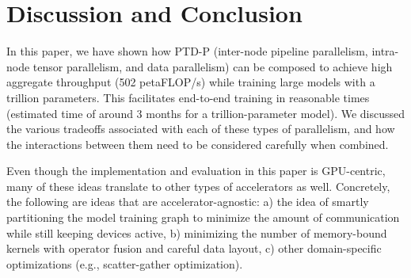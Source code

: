 \section{Discussion and Conclusion}

In this paper, we have shown how PTD-P (inter-node pipeline parallelism, intra-node tensor parallelism, and data parallelism) can be composed to achieve high aggregate throughput (502 petaFLOP/s) while training large models with a trillion parameters. This facilitates end-to-end training in reasonable times (estimated time of around 3 months for a trillion-parameter model). We discussed the various tradeoffs associated with each of these types of parallelism, and how the interactions between them need to be considered carefully when combined.

Even though the implementation and evaluation in this paper is GPU-centric, many of these ideas translate to other types of accelerators as well. Concretely, the following are ideas that are accelerator-agnostic: a) the idea of smartly partitioning the model training graph to minimize the amount of communication while still keeping devices active, b) minimizing the number of memory-bound kernels with operator fusion and careful data layout, c) other domain-specific optimizations (e.g., scatter-gather optimization).
